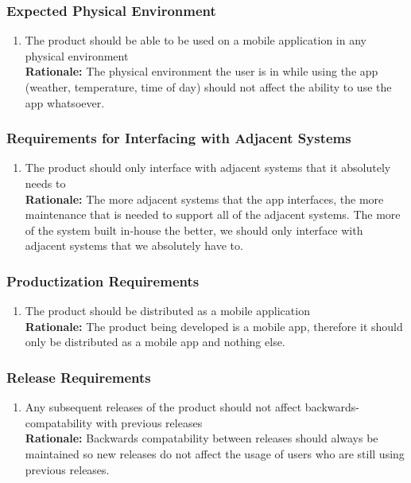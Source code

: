 \documentclass[]{article}
\begin{document}
\subsubsection{Expected Physical Environment}
\label{ssub:expected_physical_environment}
\begin{enumerate}[{OE-EPE}1. ]
	\item The product should be able to be used on a mobile application in any physical environment \\
	{\bf Rationale:} The physical environment the user is in while using the app (weather, temperature, time of day) should not affect the ability to use the app whatsoever.
\end{enumerate}

\subsubsection{Requirements for Interfacing with Adjacent Systems}
\label{ssub:requirements_for_interfacing_with_adjacent_systems}
\begin{enumerate}[{OE-IA}1. ]
	\item The product should only interface with adjacent systems that it absolutely needs to \\
	{\bf Rationale:} The more adjacent systems that the app interfaces, the more maintenance that is needed to support all of the adjacent systems. The more of the system built in-house the better, we should only interface with adjacent systems that we absolutely have to.
\end{enumerate}

\subsubsection{Productization Requirements}
\label{ssub:productization_requirements}
\begin{enumerate}[{OE-P}1. ]
	\item The product should be distributed as a mobile application \\
	{\bf Rationale:} The product being developed is a mobile app, therefore it should only be distributed as a mobile app and nothing else.
\end{enumerate}

\subsubsection{Release Requirements}
\label{ssub:release_requirements}
\begin{enumerate}[{OE-R}1. ]
	\item Any subsequent releases of the product should not affect backwards-compatability with previous releases \\
	{\bf Rationale:} Backwards compatability between releases should always be maintained so new releases do not affect the usage of users who are still using previous releases.
\end{enumerate}
\end{document}
